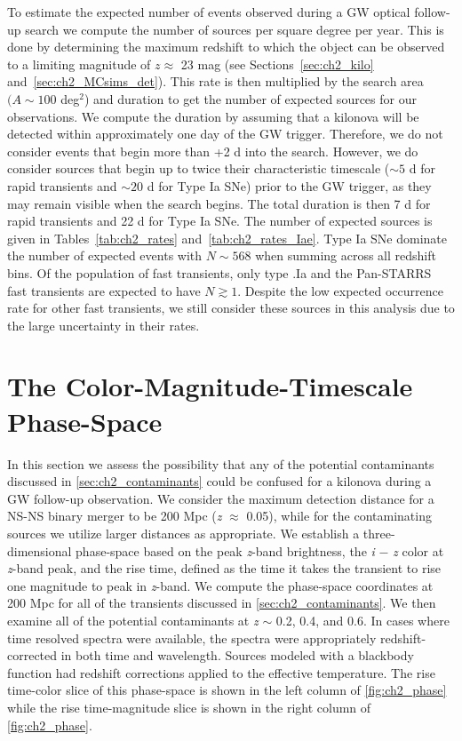 To estimate the expected number of events observed during a GW optical follow-up search we compute the number of sources per square degree per year. This is done by determining the maximum redshift to which the object can be observed to a limiting magnitude of $z \approx$ 23 mag (see Sections~\ref{sec:ch2_kilo} and~\ref{sec:ch2_MCsims_det}). This rate is then multiplied by the search area $(A \sim 100$ deg$^2$) and duration to get the number of expected sources for our observations. We compute the duration by assuming that a kilonova will be detected within approximately one day of the GW trigger. Therefore, we do not consider events that begin more than +2 d into the search. However, we do consider sources that begin up to twice their characteristic timescale ($\sim5$ d for rapid transients and $\sim 20$ d for Type Ia SNe) prior to the GW trigger, as they may remain visible when the search begins. The total duration is then 7 d for rapid transients and 22 d for Type Ia SNe. The number of expected sources is given in Tables~\ref{tab:ch2_rates} and~\ref{tab:ch2_rates_Iae}. Type Ia SNe dominate the number of expected events with $N \sim 568$ when summing across all redshift bins. Of the population of fast transients, only type .Ia and the Pan-STARRS fast transients are expected to have $N \gtrsim 1$. Despite the low expected occurrence rate for other fast transients, we still consider these sources in this analysis due to the large uncertainty in their rates.

\section{The Color-Magnitude-Timescale Phase-Space}
\label{sec:ch2_phase}
In this section we assess the possibility that any of the potential contaminants discussed in \autoref{sec:ch2_contaminants} could be confused  for a kilonova during a GW follow-up observation. We consider the maximum detection distance for a NS-NS binary merger to be 200 Mpc ({\em z} $\approx$ 0.05), while for the contaminating sources we utilize larger distances as appropriate. We establish a three-dimensional phase-space based on the peak {\em z}-band brightness, the {\em i} $-$ {\em z} color at {\em z}-band peak, and the rise time, defined as the time it takes the transient to rise one magnitude to peak in {\em z}-band. We compute the phase-space coordinates at 200 Mpc for all of the transients discussed in \autoref{sec:ch2_contaminants}. We then examine all of the potential contaminants at {\em z} $\sim$ 0.2, 0.4, and 0.6. In cases where time resolved spectra were available, the spectra were appropriately redshift-corrected in both time and wavelength. Sources modeled with a blackbody function had redshift corrections applied to the effective temperature. The rise time-color slice of this phase-space is shown in the left column of \autoref{fig:ch2_phase} while the rise time-magnitude slice is shown in the right column of \autoref{fig:ch2_phase}.

